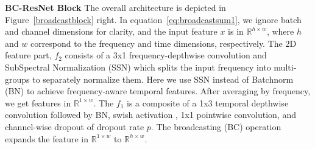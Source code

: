 \documentclass[a4paper]{article}
\begin{document}
\noindent \textbf{BC-ResNet Block} The overall architecture is depicted in Figure~\ref{broadcastblock} right. In equation~\ref{eq:broadcastsum1}, we ignore batch and channel dimensions for clarity, and the input feature $x$ is in $\mathbb{R}^{h\times w}$, where $h$ and $w$ correspond to the frequency and time dimensions, respectively. The 2D feature part, $f_2$ consists of a 3x1 frequency-depthwise convolution and SubSpectral Normalization (SSN) \cite{ssn} which splits the input frequency into multi-groups to separately normalize them. Here we use SSN instead of Batchnorm (BN) \cite{batchnorm} to achieve frequency-aware temporal features. After averaging by frequency, we get features in $\mathbb{R}^{1\times w}$. The $f_1$ is a composite of a 1x3 temporal depthwise convolution followed by BN, swish activation \cite{swish}, 1x1 pointwise convolution, and channel-wise dropout of dropout rate $p$. The broadcasting (BC) operation expands the feature in $\mathbb{R}^{1\times w}$ to $\mathbb{R}^{h\times w}$.

\begin{table}[t]
    \caption{\textbf{BC-ResNet-1.} Each row is a sequence of one or more identical modules repeated $n$ times with input shape of channel$\times$frequency$\times$time, total time steps $W$, and the number of output channels $c$. Changes in number of channels and downsampling by stride $s$ belong to the first block of each sequence of BC-ResBlocks. The temporal convolutions in all BC-ResBlocks use dilation of $d$.}
    \label{bc-resnet-0_structure}
\centering
\vskip -0.1in
\end{table}
\end{document}
